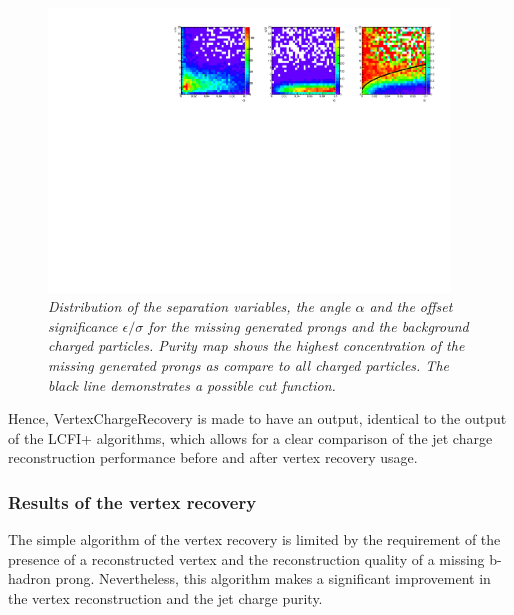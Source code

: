 \begin{figure}[h]
{\centering
    \includegraphics[width=0.95\textwidth]{ILD/plots/recovery-purity.pdf}
    \caption{\sl Distribution of the separation variables, the angle $\alpha$ and the offset significance $\epsilon/\sigma$ for the missing generated prongs and the background charged particles. Purity map shows the highest concentration of the missing generated prongs as compare to all charged particles. The black line demonstrates a possible cut function. %
    }
    \label{fig:RecoveryPurity_3}
  }
\end{figure}


Hence, VertexChargeRecovery is made to have an output, identical to the output of the LCFI+ algorithms, which allows for a clear comparison of the jet charge reconstruction performance before and after vertex recovery usage.
\subsubsection{Results of the vertex recovery}

The simple algorithm of the vertex recovery is limited by the requirement of the presence of a reconstructed vertex and the reconstruction quality of a missing b-hadron prong. 
Nevertheless, this algorithm makes a significant improvement in the vertex reconstruction and the jet charge purity.

